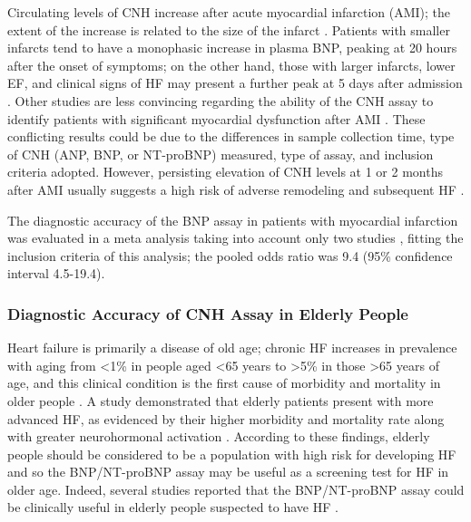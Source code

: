 \documentclass[14pt,a4paper,onecolumn]{extarticle}
\begin{document}
Circulating levels of CNH increase after acute myocardial infarction (AMI); the extent of the increase is related to the size of the infarct \citep{bib3134} \citep{bib3135} \citep{bib3136} \citep{bib3137}. Patients with smaller infarcts tend to have a monophasic increase in plasma BNP, peaking at 20 hours after the onset of symptoms; on the other hand, those with larger infarcts, lower EF, and clinical signs of HF may present a further peak at 5 days after admission \citep{bib3135}. Other studies are less convincing regarding the ability of the CNH assay to identify patients with significant myocardial dysfunction after AMI \citep{bib3138} \citep{bib3139}. These conflicting results could be due to the differences in sample collection time, type of CNH (ANP, BNP, or NT-proBNP) measured, type of assay, and inclusion criteria adopted. However, persisting elevation of CNH levels at 1 or 2 months after AMI usually suggests a high risk of adverse remodeling and subsequent HF \citep{bib35}.

The diagnostic accuracy of the BNP assay in patients with myocardial infarction was evaluated in a  meta analysis \citep{bib372} taking into account only two studies \citep{bib3140} \citep{bib3141}, fitting the inclusion criteria of this analysis; the pooled odds ratio was 9.4 (95\% confidence interval 4.5-19.4).

\subsubsection{ Diagnostic Accuracy of CNH Assay in Elderly People}

Heart failure is primarily a disease of old age; chronic HF increases in prevalence with aging from <1\% in people aged <65 years to >5\% in those >65 years of age, and this clinical condition is the first cause of morbidity and mortality in older people \citep{bib368} \citep{bib369} \citep{bib370} \citep{bib3142}. A  study demonstrated that elderly patients present with more advanced HF, as evidenced by their higher morbidity and mortality rate along with greater neurohormonal activation \citep{bib3142}. According to these findings, elderly people should be considered to be a population with high risk for developing HF and so the BNP/NT-proBNP assay may be useful as a screening test for HF in older age. Indeed, several studies reported that the BNP/NT-proBNP assay could be clinically useful in elderly people suspected to have HF \citep{bib316} \citep{bib3142} \citep{bib3143} \citep{bib3144} \citep{bib3145} \citep{bib3146} \citep{bib3147}.
\end{document}
